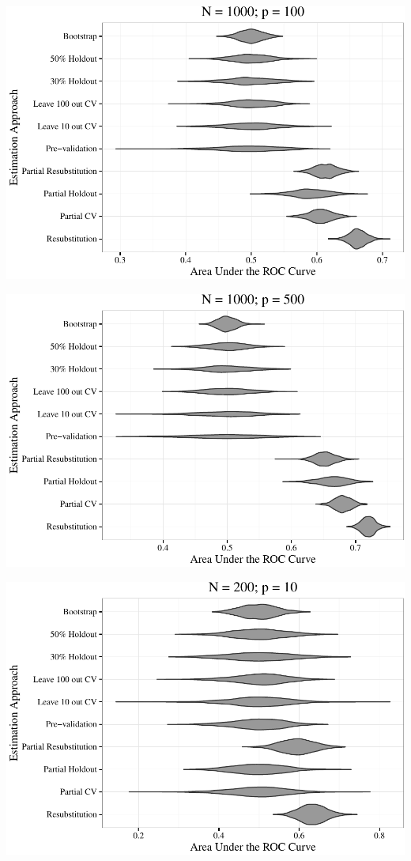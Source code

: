 \documentclass[11pt,]{article}
\begin{document}
\includegraphics{supplement_files/figure-latex/plotsauc-2.pdf}
\clearpage

\includegraphics{supplement_files/figure-latex/plotsauc-3.pdf}
\clearpage

\includegraphics{supplement_files/figure-latex/plotsauc-4.pdf}
\clearpage
\end{document}
